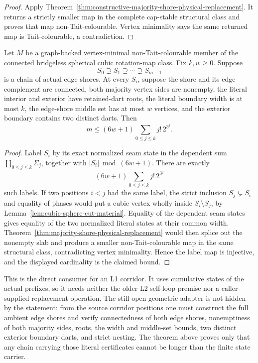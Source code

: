 \begin{proof}
Apply Theorem~\ref{thm:constructive-majority-shore-physical-replacement}.
It returns a strictly smaller map in the complete cap-stable structural
class and proves that map non-Tait-colourable.  Vertex minimality says the
same returned map is Tait-colourable, a contradiction.
\end{proof}

\begin{theorem}
\label{thm:literal-majority-shore-chain-descent}
Let \(M\) be a graph-backed vertex-minimal non-Tait-colourable member of the
connected bridgeless spherical cubic rotation-map class.  Fix \(k,w\ge0\).
Suppose
\[
                 S_0\supsetneq S_1\supsetneq\cdots\supsetneq S_{m-1}
\]
is a chain of actual edge shores.  At every \(S_i\), suppose the shore and
its edge complement are connected, both majority vertex sides are nonempty,
the literal interior and exterior have retained-dart roots, the literal
boundary width is at most \(k\), the edge-shore middle set has at most \(w\)
vertices, and the exterior boundary contains two distinct darts.  Then
\[
       m\le (6w+1)\sum_{0\le j\le k}j!\,2^{3^j}.
\]
\end{theorem}

\begin{proof}
Label \(S_i\) by its exact normalized seam state in the dependent sum
\(\coprod_{0\le j\le k}\Sigma_j\), together with
\(|S_i|\bmod(6w+1)\).  There are exactly
\[
        (6w+1)\sum_{0\le j\le k}j!\,2^{3^j}
\]
such labels.  If two positions \(i<j\) had the same label, the strict
inclusion \(S_j\subsetneq S_i\) and equality of phases would put a cubic
vertex wholly inside \(S_i\setminus S_j\), by
Lemma~\ref{lem:cubic-sphere-cut-material}.  Equality of the dependent seam
states gives equality of the two normalized literal states at their common
width.  Theorem~\ref{thm:majority-shore-physical-replacement} would then
splice out the nonempty slab and produce a smaller non-Tait-colourable map
in the same structural class, contradicting vertex minimality.  Hence the
label map is injective, and the displayed cardinality is the claimed bound.
\end{proof}

This is the direct consumer for an L1 corridor.  It uses cumulative states of
the actual prefixes, so it needs neither the older L2 self-loop premise nor a
caller-supplied replacement operation.  The still-open geometric adapter is
not hidden by the statement: from the source corridor positions one must
construct the full ambient edge shores and verify connectedness of both edge
shores, nonemptiness of both majority sides, roots, the width and middle-set
bounds, two distinct exterior boundary darts, and strict nesting.  The
theorem above proves only that any chain carrying those literal certificates
cannot be longer than the finite state carrier.

